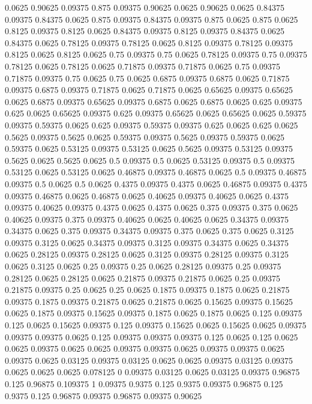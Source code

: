 0.0625 0.90625
0.09375 0.875
0.09375 0.90625
0.0625 0.90625
0.0625 0.84375
0.09375 0.84375
0.0625 0.875
0.09375 0.84375
0.09375 0.875
0.0625 0.875
0.0625 0.8125
0.09375 0.8125
0.0625 0.84375
0.09375 0.8125
0.09375 0.84375
0.0625 0.84375
0.0625 0.78125
0.09375 0.78125
0.0625 0.8125
0.09375 0.78125
0.09375 0.8125
0.0625 0.8125
0.0625 0.75
0.09375 0.75
0.0625 0.78125
0.09375 0.75
0.09375 0.78125
0.0625 0.78125
0.0625 0.71875
0.09375 0.71875
0.0625 0.75
0.09375 0.71875
0.09375 0.75
0.0625 0.75
0.0625 0.6875
0.09375 0.6875
0.0625 0.71875
0.09375 0.6875
0.09375 0.71875
0.0625 0.71875
0.0625 0.65625
0.09375 0.65625
0.0625 0.6875
0.09375 0.65625
0.09375 0.6875
0.0625 0.6875
0.0625 0.625
0.09375 0.625
0.0625 0.65625
0.09375 0.625
0.09375 0.65625
0.0625 0.65625
0.0625 0.59375
0.09375 0.59375
0.0625 0.625
0.09375 0.59375
0.09375 0.625
0.0625 0.625
0.0625 0.5625
0.09375 0.5625
0.0625 0.59375
0.09375 0.5625
0.09375 0.59375
0.0625 0.59375
0.0625 0.53125
0.09375 0.53125
0.0625 0.5625
0.09375 0.53125
0.09375 0.5625
0.0625 0.5625
0.0625 0.5
0.09375 0.5
0.0625 0.53125
0.09375 0.5
0.09375 0.53125
0.0625 0.53125
0.0625 0.46875
0.09375 0.46875
0.0625 0.5
0.09375 0.46875
0.09375 0.5
0.0625 0.5
0.0625 0.4375
0.09375 0.4375
0.0625 0.46875
0.09375 0.4375
0.09375 0.46875
0.0625 0.46875
0.0625 0.40625
0.09375 0.40625
0.0625 0.4375
0.09375 0.40625
0.09375 0.4375
0.0625 0.4375
0.0625 0.375
0.09375 0.375
0.0625 0.40625
0.09375 0.375
0.09375 0.40625
0.0625 0.40625
0.0625 0.34375
0.09375 0.34375
0.0625 0.375
0.09375 0.34375
0.09375 0.375
0.0625 0.375
0.0625 0.3125
0.09375 0.3125
0.0625 0.34375
0.09375 0.3125
0.09375 0.34375
0.0625 0.34375
0.0625 0.28125
0.09375 0.28125
0.0625 0.3125
0.09375 0.28125
0.09375 0.3125
0.0625 0.3125
0.0625 0.25
0.09375 0.25
0.0625 0.28125
0.09375 0.25
0.09375 0.28125
0.0625 0.28125
0.0625 0.21875
0.09375 0.21875
0.0625 0.25
0.09375 0.21875
0.09375 0.25
0.0625 0.25
0.0625 0.1875
0.09375 0.1875
0.0625 0.21875
0.09375 0.1875
0.09375 0.21875
0.0625 0.21875
0.0625 0.15625
0.09375 0.15625
0.0625 0.1875
0.09375 0.15625
0.09375 0.1875
0.0625 0.1875
0.0625 0.125
0.09375 0.125
0.0625 0.15625
0.09375 0.125
0.09375 0.15625
0.0625 0.15625
0.0625 0.09375
0.09375 0.09375
0.0625 0.125
0.09375 0.09375
0.09375 0.125
0.0625 0.125
0.0625 0.0625
0.09375 0.0625
0.0625 0.09375
0.09375 0.0625
0.09375 0.09375
0.0625 0.09375
0.0625 0.03125
0.09375 0.03125
0.0625 0.0625
0.09375 0.03125
0.09375 0.0625
0.0625 0.0625
0.078125 0
0.09375 0.03125
0.0625 0.03125
0.09375 0.96875
0.125 0.96875
0.109375 1
0.09375 0.9375
0.125 0.9375
0.09375 0.96875
0.125 0.9375
0.125 0.96875
0.09375 0.96875
0.09375 0.90625
